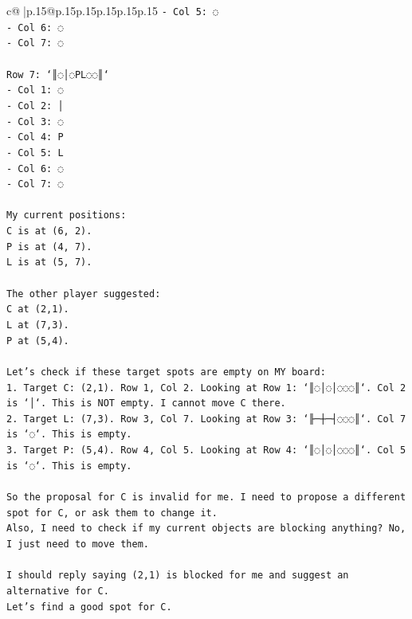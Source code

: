 \documentclass{article}
\begin{document}
{\begin{supertabular}{c@{$\;$}|p{.15\linewidth}@{}p{.15\linewidth}p{.15\linewidth}p{.15\linewidth}p{.15\linewidth}p{.15\linewidth}}
{{{\texttt{{-} Col 5: ◌} \\
\texttt{{-} Col 6: ◌} \\
\texttt{{-} Col 7: ◌} \\
\\ 
\texttt{Row 7: `║◌│◌PL◌◌║`} \\
\texttt{{-} Col 1: ◌} \\
\texttt{{-} Col 2: │} \\
\texttt{{-} Col 3: ◌} \\
\texttt{{-} Col 4: P} \\
\texttt{{-} Col 5: L} \\
\texttt{{-} Col 6: ◌} \\
\texttt{{-} Col 7: ◌} \\
\\ 
\texttt{My current positions:} \\
\texttt{C is at (6, 2).} \\
\texttt{P is at (4, 7).} \\
\texttt{L is at (5, 7).} \\
\\ 
\texttt{The other player suggested:} \\
\texttt{C at (2,1).} \\
\texttt{L at (7,3).} \\
\texttt{P at (5,4).} \\
\\ 
\texttt{Let's check if these target spots are empty on MY board:} \\
\texttt{1. Target C: (2,1). Row 1, Col 2. Looking at Row 1: `║◌│◌│◌◌◌║`. Col 2 is `│`. This is NOT empty. I cannot move C there.} \\
\texttt{2. Target L: (7,3). Row 3, Col 7. Looking at Row 3: `╟─┼─┤◌◌◌║`. Col 7 is `◌`. This is empty.} \\
\texttt{3. Target P: (5,4). Row 4, Col 5. Looking at Row 4: `║◌│◌│◌◌◌║`. Col 5 is `◌`. This is empty.} \\
\\ 
\texttt{So the proposal for C is invalid for me. I need to propose a different spot for C, or ask them to change it.} \\
\texttt{Also, I need to check if my current objects are blocking anything? No, I just need to move them.} \\
\\ 
\texttt{I should reply saying (2,1) is blocked for me and suggest an alternative for C.} \\
\texttt{Let's find a good spot for C.} \\
}}}
\end{supertabular}}
\end{document}
